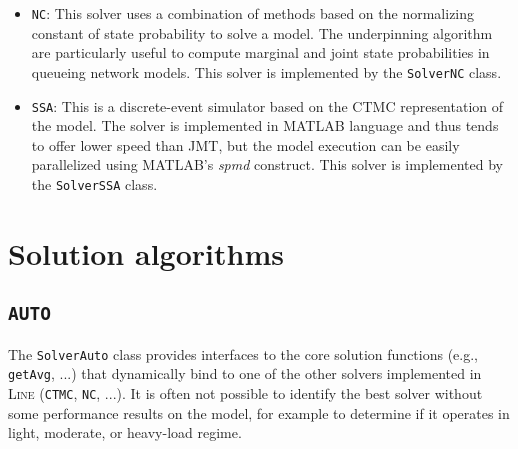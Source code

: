 \begin{itemize}
\item \texttt{NC}: This solver uses a combination of methods based on the normalizing constant of state probability to solve a model. The underpinning algorithm are particularly useful to compute marginal and joint state probabilities in queueing network models. This solver is implemented by the \texttt{SolverNC} class.
\item \texttt{SSA}: This is a discrete-event simulator based on the CTMC representation of the model. The solver is implemented in MATLAB language and thus tends to offer lower speed than JMT, but the model execution can be easily parallelized using MATLAB's {\em spmd} construct. This solver is implemented by the \texttt{SolverSSA} class.
\end{itemize}


\section{Solution algorithms}
\subsection{\texttt{AUTO}}
The \texttt{SolverAuto} class provides interfaces to the core solution functions (e.g., \texttt{getAvg}, ...) that dynamically bind to one of the other solvers implemented in \textsc{Line} (\texttt{CTMC}, \texttt{NC}, ...). It is often not possible to identify the best solver without some performance results on the model, for example to determine if it operates in light, moderate, or heavy-load regime.

